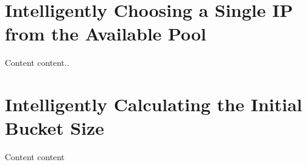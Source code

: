 \begin{appendices}
\chapter{Intelligently Choosing a Single IP from the Available Pool}
\label{appendix:smartSingleIP}
Content content..

\chapter{Intelligently Calculating the Initial Bucket Size}
\label{appendix:smartInitBucket}
Content content

\end{appendices}

